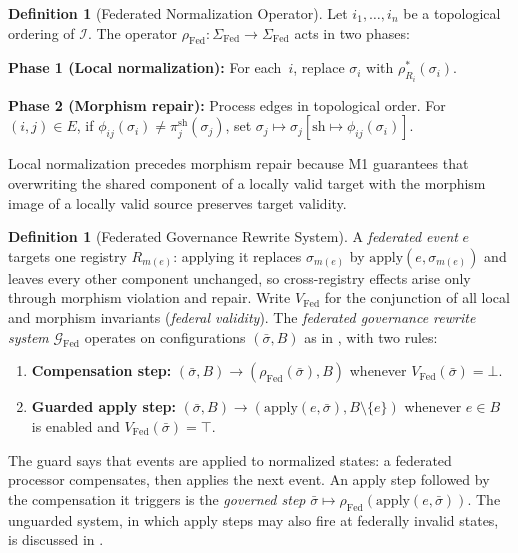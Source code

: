 \documentclass[11pt,a4paper]{article}
\theoremstyle{plain}
\theoremstyle{definition}
\newtheorem{definition}[theorem]{Definition}
\theoremstyle{remark}
\newcommand{\apply}{\mathrm{apply}}
\newcommand{\Fed}{\mathrm{Fed}}
\renewcommand{\_}{\textunderscore\allowbreak}
\begin{document}
\begin{definition}[Federated Normalization Operator]
\label{def:fed-comp}
Let $i_1, \ldots, i_n$ be a topological ordering of $\mathcal{I}$.
The operator $\rho_\Fed: \Sigma_\Fed \to \Sigma_\Fed$ acts in two phases:

\textbf{Phase 1 (Local normalization):} For each~$i$, replace $\sigma_i$ with
$\rho_{R_i}^*(\sigma_i)$.

\textbf{Phase 2 (Morphism repair):} Process edges in topological order.
For $(i,j) \in E$, if $\phi_{ij}(\sigma_i) \neq
\pi_j^{\mathrm{sh}}(\sigma_j)$, set
$\sigma_j \mapsto \sigma_j[\mathrm{sh} \mapsto \phi_{ij}(\sigma_i)]$.

Local normalization precedes morphism repair because M1 guarantees that
overwriting the shared component of a locally valid target with the morphism
image of a locally valid source preserves target validity.
\end{definition}

\begin{definition}[Federated Governance Rewrite System]
\label{def:fed-grs}
A \emph{federated event} $e$ targets one registry $R_{m(e)}$: applying it
replaces $\sigma_{m(e)}$ by $\apply(e, \sigma_{m(e)})$ and leaves every other
component unchanged, so cross-registry effects arise only through morphism
violation and repair.  Write $V_\Fed$ for the conjunction of all local and
morphism invariants (\emph{federal validity}).  The \emph{federated governance
rewrite system} $\mathcal{G}_\Fed$ operates on configurations
$(\bar{\sigma}, B)$ as in , with two rules:
\begin{enumerate}[leftmargin=*,nosep]
\item \textbf{Compensation step:} $(\bar{\sigma}, B) \to (\rho_\Fed(\bar{\sigma}), B)$
  whenever $V_\Fed(\bar{\sigma}) = \bot$.
\item \textbf{Guarded apply step:}
  $(\bar{\sigma}, B) \to (\apply(e, \bar{\sigma}), B \setminus \{e\})$ whenever
  $e \in B$ is enabled and $V_\Fed(\bar{\sigma}) = \top$.
\end{enumerate}
The guard says that events are applied to normalized states: a federated
processor compensates, then applies the next event.  An apply step followed by
the compensation it triggers is the \emph{governed step}
$\bar{\sigma} \mapsto \rho_\Fed(\apply(e, \bar{\sigma}))$.  The unguarded
system, in which apply steps may also fire at federally invalid states, is
discussed in .
\end{definition}
\end{document}
